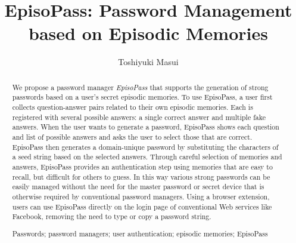 \documentclass[runningheads,a4paper]{llncs}
\newcommand{\keywords}[1]{\par\addvspace\baselineskip
\noindent\keywordname\enspace\ignorespaces#1}
\begin{document}
\mainmatter  %

\title{EpisoPass: Password Management based on Episodic Memories}


%
%
\author{Toshiyuki Masui%
}
%


%
%

\maketitle


\begin{abstract}
We propose a password manager \textit{EpisoPass} that supports the
generation of strong passwords based on a user's secret episodic
memories. To use EpisoPass, a user first collects question-answer
pairs related to their own episodic memories. Each is registered with
several possible answers: a single correct answer and multiple fake
answers. When the user wants to generate a password, EpisoPass shows
each question and list of possible answers and asks the user to select
those that are correct. EpisoPass then generates a domain-unique
password by substituting the characters of a seed string based on the
selected answers. Through careful selection of memories and answers,
EpisoPass provides an authentication step using memories that are easy
to recall, but difficult for others to guess. In this way various
strong passwords can be easily managed without the need for the master
password or secret device that is otherwise required by conventional
password managers. Using a browser extension, users can use EpisoPass
directly on the login page of conventional Web services like Facebook,
removing the need to type or copy a password string.

\keywords{Passwords; password managers; user authentication; episodic memories; EpisoPass}
\end{abstract}
\end{document}
